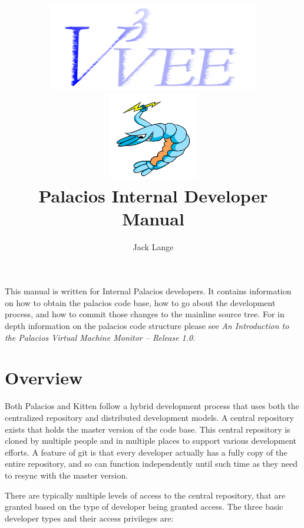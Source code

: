 \documentclass[11pt]{article}
\begin{document}
\title{
\includegraphics[height=1.5in]{v3vee.pdf}
\includegraphics[height=1.5in]{logo6.png} \\
\vspace{0.5in} 
Palacios Internal Developer Manual
}
\author{Jack Lange}

\maketitle


This manual is written for Internal Palacios developers. It contains
information on how to obtain the palacios code base, how to go about
the development process, and how to commit those changes to the
mainline source tree. For in depth information on the palacios code
structure please see {\em An Introduction to the Palacios Virtual
Machine Monitor -- Release 1.0}.


\section{Overview}


Both Palacios and Kitten follow a hybrid development process that
uses both the centralized repository and distributed development
models. A central repository exists that holds the master version of
the code base. This central repository is cloned by multiple people
and in multiple places to support various development efforts. A
feature of git is that every developer actually has a fully copy of
the entire repository, and so can function independently until such
time as they need to resync with the master version. 

There are typically multiple levels of access to the central
repository, that are granted based on the type of developer being
granted access. The three basic developer types and their access
privileges are:
\end{document}
